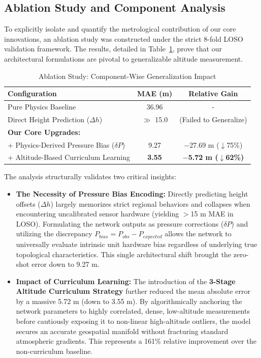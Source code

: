 \subsection{Ablation Study and Component Analysis}
\label{subsec:ablation}

To explicitly isolate and quantify the metrological contribution of our core innovations, an ablation study was constructed under the strict 8-fold LOSO validation framework. The results, detailed in Table~\ref{tab:ablation}, prove that our architectural formulations are pivotal to generalizable altitude measurement.

\begin{table}[htbp]
\caption{Ablation Study: Component-Wise Generalization Impact}
\label{tab:ablation}
\centering
\begin{tabular}{lcc}
\toprule
\textbf{Configuration} & \textbf{MAE (m)} & \textbf{Relative Gain} \\
\midrule
Pure Physics Baseline & 36.96 & - \\
\midrule
Direct Height Prediction ($\Delta h$) & $\gg$ 15.0 & (Failed to Generalize) \\
\textbf{Our Core Upgrades:} & & \\
+ Physics-Derived Pressure Bias ($\delta P$) & 9.27 & $-$27.69 m ($\downarrow$75\%) \\
+ Altitude-Based Curriculum Learning & \textbf{3.55} & \textbf{$-$5.72 m ($\downarrow$62\%)} \\
\bottomrule
\end{tabular}
\end{table}

The analysis structurally validates two critical insights:
\begin{itemize}
    \item \textbf{The Necessity of Pressure Bias Encoding:} Directly predicting height offsets ($\Delta h$) largely memorizes strict regional behaviors and collapses when encountering uncalibrated sensor hardware (yielding $>$15 m MAE in LOSO). Formulating the network outputs as pressure corrections ($\delta P$) and utilizing the discrepancy $P_{bias} = P_{obs} - P_{expected}$ allows the network to universally evaluate intrinsic unit hardware bias regardless of underlying true topological characteristics. This single architectural shift brought the zero-shot error down to 9.27 m.
    
    \item \textbf{Impact of Curriculum Learning:} The introduction of the \textbf{3-Stage Altitude Curriculum Strategy} further reduced the mean absolute error by a massive 5.72 m (down to 3.55 m). By algorithmically anchoring the network parameters to highly correlated, dense, low-altitude measurements before cautiously exposing it to non-linear high-altitude outliers, the model secures an accurate geospatial manifold without fracturing standard atmospheric gradients. This represents a 161\% relative improvement over the non-curriculum baseline.
\end{itemize}

